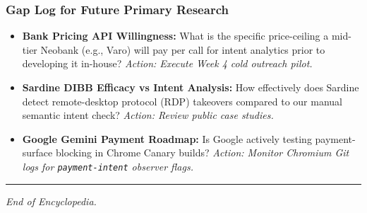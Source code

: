\documentclass[
]{article}
\providecommand{\tightlist}{%
  \setlength{\itemsep}{0pt}\setlength{\parskip}{0pt}}
\begin{document}
\subsubsection{Gap Log for Future Primary
Research}\label{gap-log-for-future-primary-research}

\begin{itemize}
\tightlist
\item
  \textbf{Bank Pricing API Willingness:} What is the specific
  price-ceiling a mid-tier Neobank (e.g., Varo) will pay per call for
  intent analytics prior to developing it in-house? \emph{Action:
  Execute Week 4 cold outreach pilot.}
\item
  \textbf{Sardine DIBB Efficacy vs Intent Analysis:} How effectively
  does Sardine detect remote-desktop protocol (RDP) takeovers compared
  to our manual semantic intent check? \emph{Action: Review public case
  studies.}
\item
  \textbf{Google Gemini Payment Roadmap:} Is Google actively testing
  payment-surface blocking in Chrome Canary builds? \emph{Action:
  Monitor Chromium Git logs for \texttt{payment-intent} observer flags.}
\end{itemize}

\begin{center}\rule{0.5\linewidth}{0.5pt}\end{center}

\emph{End of Encyclopedia.}
\end{document}
